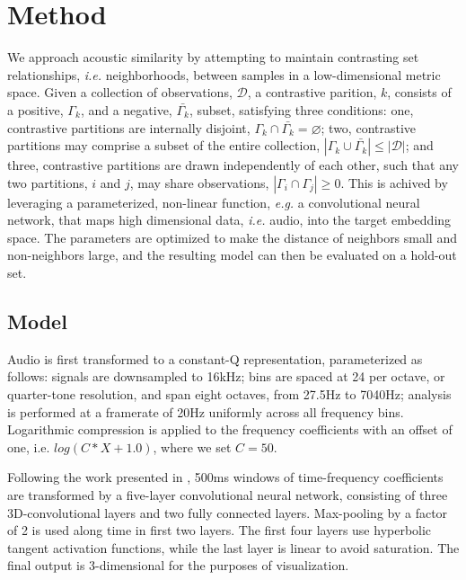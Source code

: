 \documentclass{article}
\begin{document}
\section{Method}

We approach acoustic similarity by attempting to maintain contrasting set relationships, \emph{i.e.} neighborhoods, between samples in a low-dimensional metric space.
Given a collection of observations, $\mathcal{D}$, a contrastive parition, $k$, consists of a positive, $\Gamma_k$, and a negative, $\bar{\Gamma_k}$, subset, satisfying three conditions:
one, contrastive partitions are internally disjoint, $\Gamma_k \cap \bar{\Gamma_k} = \varnothing$;
two, contrastive partitions may comprise a subset of the entire collection, $|\Gamma_k \cup \bar{\Gamma_k}| \le |\mathcal{D}|$;
and three, contrastive partitions are drawn independently of each other, such that any two partitions, $i$ and $j$, may share observations, $|\Gamma_i \cap \Gamma_j| \ge 0$.
This is achived by leveraging a parameterized, non-linear function, \emph{e.g.} a convolutional neural network, that maps high dimensional data, \emph{i.e.} audio, into the target embedding space.
The parameters are optimized to make the distance of neighbors small and non-neighbors large, and the resulting model can then be evaluated on a hold-out set.


\subsection{Model}

Audio is first transformed to a constant-Q representation, parameterized as follows:
signals are downsampled to 16kHz;
bins are spaced at 24 per octave, or quarter-tone resolution, and span eight octaves, from 27.5Hz to 7040Hz;
analysis is performed at a framerate of 20Hz uniformly across all frequency bins.
Logarithmic compression is applied to the frequency coefficients with an offset of one, i.e. $log(C*X + 1.0)$, where we set $C=50$.

Following the work presented in \cite{humphrey2015dl4mir}, 500ms windows of time-frequency coefficients are transformed by a five-layer convolutional neural network, consisting of three 3D-convolutional layers and two fully connected layers.
Max-pooling by a factor of 2 is used along time in first two layers.
The first four layers use hyperbolic tangent activation functions, while the last layer is linear to avoid saturation.
The final output is 3-dimensional for the purposes of visualization.
\end{document}
